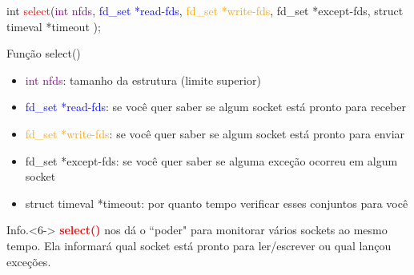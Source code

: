 \documentclass[10pt, xcolor=x11names]{beamer}
\begin{document}

\begin{frame}

int \textcolor{red}{select}(\textcolor{purple}{int nfds}, \textcolor{blue}{fd\_set *read-fds}, \textcolor{orange}{fd\_set *write-fds}, \textcolor[rgb]{.75,.48,0}{fd\_set *except-fds}, \textcolor[rgb]{.74,.01,.61}{struct timeval *timeout} );
	\begin{block}{Função select()}
	
		\begin{itemize}[<+->]
			\item \textcolor{purple}{int nfds}: tamanho da estrutura (limite superior)
			\item \textcolor{blue}{fd\_set *read-fds}: se você quer saber se algum socket está pronto para receber
			\item \textcolor{orange}{fd\_set *write-fds}: se você quer saber se algum socket está pronto para enviar
			\item \textcolor[rgb]{.75,.48,0}{fd\_set *except-fds}: se você quer saber se alguma exceção ocorreu em algum socket
			\item \textcolor[rgb]{.74,.01,.61}{struct timeval *timeout}: por quanto tempo verificar esses conjuntos para você
		\end{itemize}

	\end{block}

	\begin{alertblock}{Info.}<6->
	\footnotesize
		\textcolor{red}{\textbf{select()}} nos dá o ``poder" para monitorar vários sockets ao mesmo tempo. Ela informará qual socket está pronto para ler/escrever ou qual lançou exceções.

	\end{alertblock}
	
\end{frame}

\end{document}
